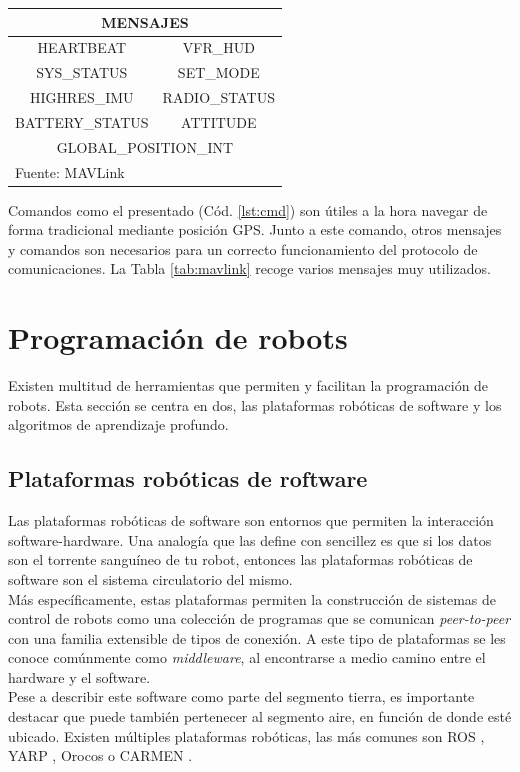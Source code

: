 \documentclass[../main.tex]{subfiles}
\begin{document}
\begin{table}[H]
	{\begin{tabular}{|c|c|}
		\multicolumn{2}{c}{\textbf{MENSAJES}} \\
		\hline
		HEARTBEAT           & VFR\_HUD  \\
		\hline
        SYS\_STATUS         & SET\_MODE \\
        \hline
        HIGHRES\_IMU        & RADIO\_STATUS     \\
        \hline
        BATTERY\_STATUS     & ATTITUDE  \\
        \hline
        \multicolumn{2}{|c|}{GLOBAL\_POSITION\_INT}  \\ 
        \hline
		\multicolumn{2}{l}{Fuente: MAVLink \cite{mavlink}}
	\end{tabular}}
\end{table}

Comandos como el presentado (Cód. \ref{lst:cmd}) son útiles a la hora navegar de forma tradicional mediante posición GPS. Junto a este comando, otros mensajes y comandos son necesarios para un correcto funcionamiento del protocolo de comunicaciones. La Tabla \ref{tab:mavlink} recoge varios mensajes muy utilizados.

\section{Programación de robots}
Existen multitud de herramientas que permiten y facilitan la programación de robots. Esta sección se centra en dos, las plataformas robóticas de software y los algoritmos de aprendizaje profundo. 

\subsection{Plataformas robóticas de roftware} \label{section:herram-rob-platf}
Las plataformas robóticas de software son entornos que permiten la interacción software-hardware. Una analogía que las define con sencillez es que si los datos son el torrente sanguíneo de tu robot, entonces las plataformas robóticas de software son el sistema circulatorio del mismo. \\
Más específicamente, estas plataformas permiten la construcción de sistemas de control de robots como una colección de programas que se comunican \emph{peer-to-peer} con una familia extensible de tipos de conexión. A este tipo de plataformas se les conoce comúnmente como \emph{middleware}, al encontrarse a medio camino entre el hardware y el software. \\
Pese a describir este software como parte del segmento tierra, es importante destacar que puede también pertenecer al segmento aire, en función de donde esté ubicado.
Existen múltiples plataformas robóticas, las más comunes son ROS \cite{quigley2009ros}, YARP \cite{fitzpatrick2014middle, metta2006yarp}, Orocos \cite{bruyninckx2001open} o CARMEN \cite{montemerlo2003perspectives}.
\end{document}
